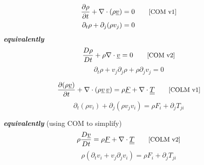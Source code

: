\documentclass[12pt,landscape]{article}
\begin{document}
\thispagestyle{fancy}

\Large

\begin{minipage}[t]{0.45\textwidth}
\section*{\centering{}}
\begin{align}
    \frac{\partial \rho}{\partial t} + \nabla\cdot(\rho \underline{v}) &= 0 \tag*{\text{\small[COM v1]}}\\
    \partial_t\rho + \partial_j (\rho v_j) &= 0 \nonumber
\end{align}
\textbf{\emph{equivalently}}
\begin{equation}
    \frac{D \rho}{D t} + \rho\nabla\cdot\underline{v} = 0
    \tag*{\text{\small[COM v2]}}
\end{equation}
\begin{equation*}
    \partial_t\rho + v_j\partial_j \rho + \rho \partial_j v_j = 0
\end{equation*}
\noindent\makebox[\linewidth]{\rule{\textwidth}{1pt}}

\vspace{-3mm}

\begin{equation}
    \frac{\partial (\rho \underline{v})}{\partial t} + \nabla\cdot(\rho \underline{v} \, \underline{v}) = \rho\underline{F} + \nabla\cdot\underline{\underline{T}}
    \tag*{\text{\small[COLM v1]}}
\end{equation}
\begin{equation*}
    \partial_t (\rho v_i) + \partial_j(\rho v_j v_i) = \rho F_i + \partial_j T_{ji}
\end{equation*}

\textbf{\emph{equivalently}} (using COM to simplify)
\begin{equation}
    \rho\frac{D \underline{v}}{D t} = \rho\underline{F} + \nabla\cdot\underline{\underline{T}} \tag*{\text{\small[COLM v2]}}
\end{equation}
\begin{equation*}
    \rho \left(\partial_t v_i + v_j\partial_j v_i\right) = \rho F_i + \partial_j T_{ji}
\end{equation*}

\noindent\makebox[\linewidth]{\rule{\textwidth}{1pt}}

\end{minipage}
\hfill
\end{document}
